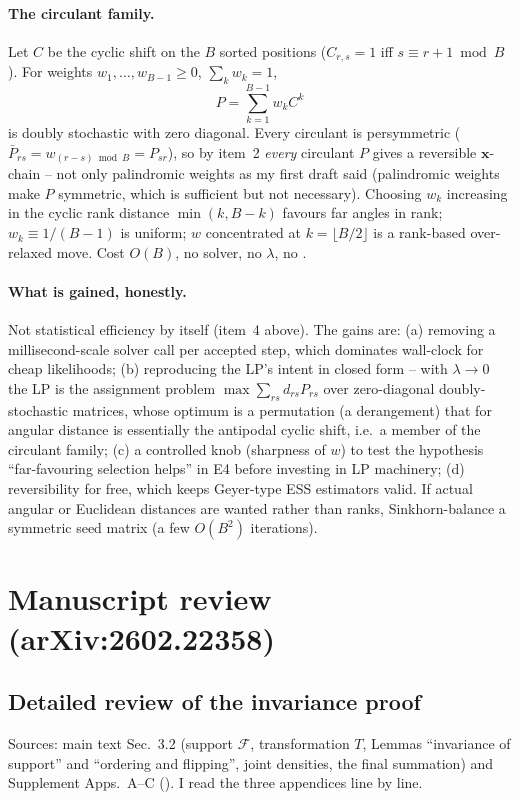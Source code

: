 \documentclass[11pt,a4paper]{article}
\theoremstyle{remark}
\newcommand{\bx}{\bm{x}}
\begin{document}
\paragraph{The circulant family.}
Let $C$ be the cyclic shift on the $B$ sorted positions ($C_{r,s}=1$ iff $s\equiv r+1\bmod B$). For weights $w_1,\dots,w_{B-1}\ge0$, $\sum_kw_k=1$,
\[
P=\sum_{k=1}^{B-1}w_kC^k
\]
is doubly stochastic with zero diagonal. Every circulant is persymmetric ($\bar P_{rs}=w_{(r-s)\bmod B}=P_{sr}$), so by item~2 \emph{every} circulant $P$ gives a reversible $\bx$-chain -- not only palindromic weights as my first draft said (palindromic weights make $P$ symmetric, which is sufficient but not necessary). Choosing $w_k$ increasing in the cyclic rank distance $\min(k,B-k)$ favours far angles in rank; $w_k\equiv1/(B-1)$ is uniform; $w$ concentrated at $k=\lfloor B/2\rfloor$ is a rank-based over-relaxed move. Cost $O(B)$, no solver, no $\lambda$, no .

\paragraph{What is gained, honestly.} Not statistical efficiency by itself (item~4 above). The gains are: (a) removing a millisecond-scale solver call per accepted step, which dominates wall-clock for cheap likelihoods; (b) reproducing the LP's intent in closed form -- with $\lambda\to0$ the LP is the assignment problem $\max\sum_{rs}d_{rs}P_{rs}$ over zero-diagonal doubly-stochastic matrices, whose optimum is a permutation (a derangement) that for angular distance is essentially the antipodal cyclic shift, i.e.\ a member of the circulant family; (c) a controlled knob (sharpness of $w$) to test the hypothesis ``far-favouring selection helps'' in E4 before investing in LP machinery; (d) reversibility for free, which keeps Geyer-type ESS estimators valid. If actual angular or Euclidean distances are wanted rather than ranks, Sinkhorn-balance a symmetric seed matrix (a few $O(B^2)$ iterations).

\section{Manuscript review (arXiv:2602.22358)}\label{sec:paper}
\subsection{Detailed review of the invariance proof}\label{sec:proofreview}
Sources: main text Sec.~3.2 (support $\mathcal F$, transformation $T$, Lemmas ``invariance of support'' and ``ordering and flipping'', joint densities, the final summation) and Supplement Apps.~A--C (). I read the three appendices line by line.
\end{document}
